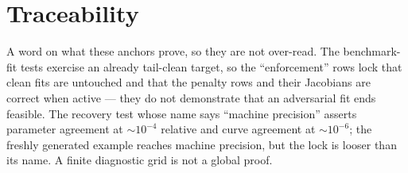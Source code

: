 \documentclass[11pt]{article}
\begin{document}
\section{Traceability}
\label{app:trace}

A word on what these anchors prove, so they are not over-read.  The benchmark-fit
tests exercise an already tail-clean target, so the ``enforcement'' rows lock
that clean fits are untouched and that the penalty rows and their Jacobians are
correct when active --- they do not demonstrate that an adversarial fit ends
feasible.  The recovery test whose name says ``machine precision'' asserts
parameter agreement at $\sim10^{-4}$ relative and curve agreement at
$\sim10^{-6}$; the freshly generated example reaches machine precision, but the
lock is looser than its name.  A finite diagnostic grid is not a global proof.
\end{document}
